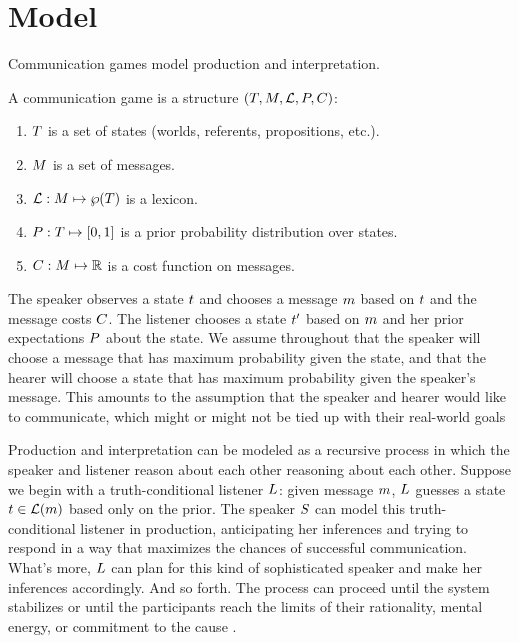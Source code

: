 \section{Model}\label{sec:model}

Communication games model production and interpretation.  

\begin{definition}\label{def:struc} 
  A communication game is a structure $(T, M, \mathcal{L}, P, C)$:
  \begin{enumerate}\setlength{\itemsep}{0pt}
  \item $T$ is a set of states (worlds, referents, propositions, etc.).
  \item $M$ is a set of messages.
  \item $\mathcal{L}: M \mapsto \wp(T)$ is a lexicon.
  \item $P : T \mapsto [0,1]$ is a prior probability
    distribution over states.   
  \item $C : M \mapsto \mathbb{R}$ is a cost function on messages.
  \end{enumerate}
\end{definition}

The speaker observes a state $t$ and chooses a message $m$
based on $t$ and the message costs $C$. The listener chooses
a state $t'$ based on $m$ and her prior expectations $P$
about the state.  We assume throughout that the speaker will choose a
message that has maximum probability given the state, and that the
hearer will choose a state that has maximum probability given the
speaker's message.  This amounts to the assumption that the speaker
and hearer would like to communicate, which might or might not be tied
up with their real-world goals
\cite{Franke-etal:2009,Asher:Lascarides:2013}

Production and interpretation can be modeled as a recursive process in
which the speaker and listener reason about each other reasoning about
each other.  Suppose we begin with a truth-conditional listener
$L$: given message $m$, $L$ guesses a
state $t \in \mathcal{L}(m)$ based only on the prior.  The speaker
$S$ can model this truth-conditional listener in
production, anticipating her inferences and trying to respond in a way
that maximizes the chances of successful communication.  What's more,
$L$ can plan for this kind of sophisticated speaker and
make her inferences accordingly.  And so forth. The process can
proceed until the system stabilizes or until the participants reach
the limits of their rationality, mental energy, or commitment to the
cause
\cite{CamererHo:2004,Franke:2008,Franke09DISS,Jaeger:2007,Jaeger:2011}.

